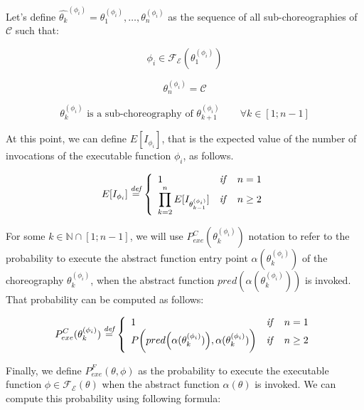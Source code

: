 \documentclass[10pt,a4paper]{report}
\newcommand*{\N}{\mathbb{N}}
\newcommand{\mathDef}{\overset{\textit{def}}{=}}
\theoremstyle{definition}
\begin{document}
Let's define $\widehat{\theta_k}^{(\phi_i)} = {\theta^{(\phi_i)}_1, \ldots, \theta^{(\phi_i)}_n}$  as the sequence of all sub-choreographies of $\mathcal{C}$ such that:

\begin{equation}
	\phi_i \in \mathscr{F_E}(\theta^{(\phi_i)}_1)
\end{equation}

\begin{equation}
	\theta^{(\phi_i)}_n = \mathcal{C}
\end{equation}

\begin{equation}
	\theta^{(\phi_i)}_k \text{ is a sub-choreography of } \theta^{(\phi_i)}_{k+1} \qquad \forall k \in \left[1;n-1\right]
\end{equation}

At this point, we can define $E[I_{\phi_i}]$, that is the expected value of the number of invocations of the executable function $\phi_i$, as follows.

\begin{equation}	
	E[I_{\phi_i}] \mathDef \left\{
	\begin{array}{lcr}
		1 & \text{\textit{if}} & n = 1 \\ 
		\displaystyle \prod_{k = 2}^n E[I_{\theta_{k-1}^{(\phi_i)}}] & \text{\textit{if}} & n \geq 2 \\
	\end{array} \right.
\end{equation}

For some $k \in \N \cap \left[1;n-1\right]$, we will use $P_{exe}^C(\theta^{(\phi_i)}_k)$ notation to refer to the probability to execute the abstract function entry point $\alpha(\theta^{(\phi_i)}_k)$ of the choreography $\theta^{(\phi_i)}_k$, when the abstract function $pred(\alpha(\theta^{(\phi_i)}_k))$ is invoked. That probability can be computed as follows:

\begin{equation}	
	P_{exe}^C(\theta^{(\phi_i)}_k) \mathDef \left\{
	\begin{array}{lcr}
		1 & \text{\textit{if}} & n = 1 \\ 
	    P \bigg(  pred\Big( \alpha(\theta^{(\phi_i)}_{k}) \Big), \alpha(\theta^{(\phi_i)}_{k}) \bigg) & \text{\textit{if}} & n \geq 2 \\
	\end{array} \right.
\end{equation}


Finally, we define $P_{exe}^{F}(\theta, \phi)$ as the probability to execute the executable function $\phi \in \mathscr{F_E}(\theta)$ when the abstract function $\alpha(\theta)$ is invoked. We can compute this probability using following formula:
\end{document}
